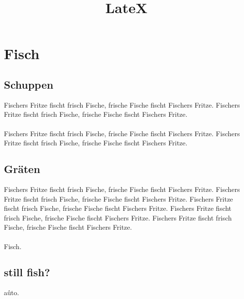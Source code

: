 \documentclass[12pt]{scrartcl}
\begin{document}
	
\title{LateX}
\publishers{Lehrer: A. Stolpe}
	
	
\section{Fisch}
\subsection{Schuppen}
	Fischers Fritze fischt frisch Fische,
	frische Fische fischt Fischers Fritze.
	Fischers Fritze fischt frisch Fische,
	frische Fische fischt Fischers Fritze. \\\\
	Fischers Fritze fischt frisch Fische,
	frische Fische fischt Fischers Fritze.
	Fischers Fritze fischt frisch Fische,
	frische Fische fischt Fischers Fritze.
\subsection{Gräten}
	Fischers Fritze fischt frisch Fische,
	frische Fische fischt Fischers Fritze.
	Fischers Fritze fischt frisch Fische,
	frische Fische fischt Fischers Fritze.
	Fischers Fritze fischt frisch Fische,
	frische Fische fischt Fischers Fritze.
	Fischers Fritze fischt frisch Fische,
	frische Fische fischt Fischers Fritze.
	Fischers Fritze fischt frisch Fische,
	frische Fische fischt Fischers Fritze.  \\\\ 
	Fisch.
\subsection{still fish?}
	aûto.

\newpage
\end{document}
